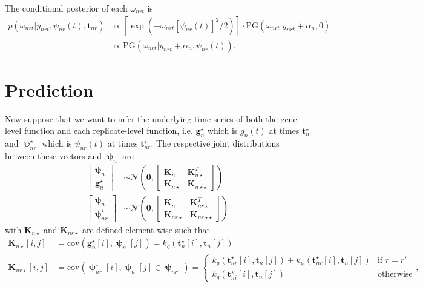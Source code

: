 \documentclass{article}
\newcommand{\pN}{\mathcal{N}}
\newcommand{\1}{\mathbf{1}}
\newcommand{\0}{\mathbf{0}}
\newcommand{\K}{\mathbf{K}}
\begin{document}
%
%
%
%
The conditional posterior of each $\omega_{nrt}$ is 
%
%
\begin{align*}
	p(\omega_{nrt} | y_{nrt}, \psi_{nr}(t), \mathbf{t}_{nr}) &\propto \left[ \exp\left( -\omega_{nrt}\left[ \psi_{nr}(t) \right]^2 / 2 \right) \right] \cdot \text{PG}(\omega_{nrt} | y_{nrt} + \alpha_{n}, 0) \\
	&\propto \text{PG}(\omega_{nrt} | y_{nrt} + \alpha_{n}, \psi_{nr}(t)).
\end{align*}

\section{Prediction}

Now suppose that we want to infer the underlying time series of both the gene-level function and each replicate-level function, i.e. $\mathbf{g}_n^\star$ which is $g_n(t)$ at times $\mathbf{t}_{n}^\star$ and $\bm{\uppsi}_{nr}^{\star}$ which is $\psi_{nr}(t)$ at times $\mathbf{t}_{nr}^\star$. The respective joint distributions between these vectors and $\bm{\uppsi}_{n}$ are 
%
%
\begin{align*}
	\begin{bmatrix}
			\bm{\uppsi}_{n} \\
			\mathbf{g}_{n}^\star 
	\end{bmatrix} &\sim \pN \left( \mathbf{0}, \begin{bmatrix}
 			\K_n & \K_{n\star}^T \\
 			\K_{n\star} & \K_{n\star\star}
 		\end{bmatrix} \right) \\
%
%
	\begin{bmatrix}
		\bm{\uppsi}_{n} \\
		\bm{\uppsi}_{nr}^\star
	\end{bmatrix} &\sim \pN \left( \mathbf{0}, \begin{bmatrix}
		\K_n & \K_{nr\star}^T \\
		\K_{nr\star} & \K_{nr\star\star}
	\end{bmatrix} \right) 
\end{align*}
%
%
with $\K_{n\star}$ and $\K_{nr\star}$ are defined element-wise such that 
%
%
\begin{align*}
	\K_{n\star}[i, j] &= \text{cov}\left( \mathbf{g}_{n}^\star[i] , \bm{\uppsi}_{n}[j] \right) = k_g(\mathbf{t}_{n}^\star[i], \mathbf{t}_n[j]) \\
	\K_{nr\star}[i, j] &= \text{cov}\left( \bm{\uppsi}_{nr}^\star[i], \bm{\uppsi}_{n}[j] \in \bm{\uppsi}_{nr'}  \right) = \begin{cases}
		k_g(\mathbf{t}_{nr}^\star[i], \mathbf{t}_n[j]) + k_\psi(\mathbf{t}_{nr}^\star[i], \mathbf{t}_n[j]) & \text{if } r = r' \\
		k_g(\mathbf{t}_{ni}^\star[i], \mathbf{t}_n[j]) & \text{otherwise}
	\end{cases},
\end{align*}
\end{document}
